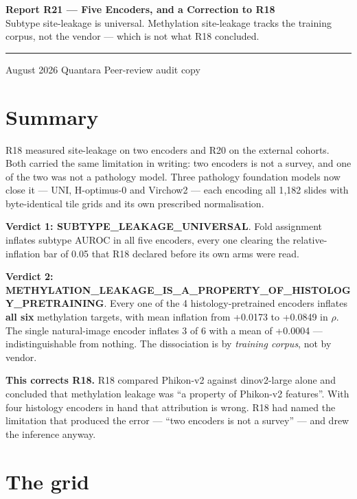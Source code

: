 \documentclass[11pt,a4paper]{article}
\begin{document}
\thispagestyle{empty}
\noindent
{\large\bfseries\color{qnavy} Report R21 --- Five Encoders, and a Correction to R18}\\[2pt]
{\color{qgrey}Subtype site-leakage is universal. Methylation site-leakage tracks the training
corpus, not the vendor --- which is not what R18 concluded.}\\[6pt]
{\color{qgrey}\rule{\textwidth}{0.4pt}}

\medskip
{} August 2026 \quad\textbullet\quad Quantara \quad\textbullet\quad
{\color{qgrey}Peer-review audit copy}

\medskip
{}

\section*{Summary}

R18 measured site-leakage on two encoders and R20 on the external cohorts. Both carried the same
limitation in writing: two encoders is not a survey, and one of the two was not a pathology model.
Three pathology foundation models now close it --- UNI, H-optimus-0 and Virchow2 --- each encoding
all 1{,}182 slides with byte-identical tile grids and its own prescribed normalisation.

\textbf{Verdict 1: SUBTYPE\_LEAKAGE\_UNIVERSAL}. Fold assignment inflates subtype AUROC in
all five encoders, every one clearing the relative-inflation bar of 0.05 that R18 declared before
its own arms were read.

\textbf{Verdict 2: METHYLATION\_LEAKAGE\_IS\_A\_PROPERTY\_OF\_HISTOLOGY\_PRETRAINING}. Every one of the 4 histology-pretrained encoders inflates
\textbf{all six} methylation targets, with mean inflation from
+0.0173 to
+0.0849 in $\rho$. The single natural-image encoder
inflates 3 of 6 with a mean of
+0.0004 --- indistinguishable from nothing. The dissociation is
by \emph{training corpus}, not by vendor.

\textcolor{qred}{\textbf{This corrects R18.}} R18 compared Phikon-v2 against dinov2-large
alone and concluded that methylation leakage was ``a property of Phikon-v2 features''. With four
histology encoders in hand that attribution is wrong. R18 had named the limitation that produced
the error --- ``two encoders is not a survey'' --- and drew the inference anyway.

\section{The grid}
\end{document}
